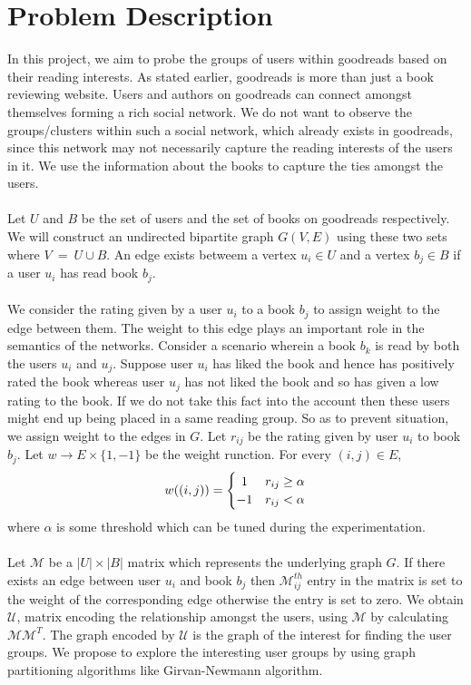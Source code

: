 \documentclass[11pt]{article}
\begin{document}
\section{Problem Description}
In this project, we aim to probe the groups of users within goodreads based on their reading interests. As stated earlier, goodreads is more than just a book reviewing website. Users and authors on goodreads can connect amongst themselves forming a rich social network. We do not want to observe the groups/clusters within such a social network, which already exists in goodreads, since this network may not necessarily capture the reading interests of the users in it. We use the information about the books to capture the ties amongst the users. \\\\
Let $U$ and $B$ be the set of users and the set of books on goodreads respectively. We will construct an undirected bipartite graph $G(V, E)$ using these two sets where $V ~=~ U \cup B$. An edge exists betweem a vertex $u_i \in U$ and a vertex $b_j \in B$ if a user $u_i$ has read book $b_j$.\\\\
We consider the rating given by a user $u_i$ to a book $b_j$ to assign weight to the edge between them. The weight to this edge plays an important role in the semantics of the networks. Consider a scenario wherein a book $b_k$ is read by both the users $u_i$ and $u_j$. Suppose user $u_i$ has liked the book and hence has positively rated the book whereas user $u_j$ has not liked the book and so has given a low rating to the book. If we do not take this fact into the account then these users might end up being placed in a same reading group. So as to prevent situation, we assign weight to the edges in $G$. Let $r_{ij}$ be the rating given by user $u_i$ to book $b_j$. Let $w \rightarrow E \times \{1, -1\}$ be the weight runction. For every $(i, j) \in E$, 
\[
	w((i, j)) = \left\{\def\arraystretch{1.2}%
		\begin{array}{@{}c@{\quad}l@{}}
		1 & r_{ij} \geq \alpha\\
		-1 & r_{ij} < \alpha\\
		\end{array}\right.
\]
where $\alpha$ is some threshold which can be tuned during the experimentation.
\\\\
Let $\mathcal{M}$ be a $|U| \times |B|$ matrix which represents the underlying graph $G$. If there exists an edge between user $u_i$ and book $b_j$ then $\mathcal{M}_{ij}^{th}$ entry in the matrix is set to the weight of the corresponding edge otherwise the entry is set to zero. We obtain $\mathcal{U}$, matrix encoding the relationship amongst the users, using $\mathcal{M}$ by calculating $\mathcal{M}\mathcal{M}^{T}$. The graph encoded by $\mathcal{U}$ is the graph of the interest for finding the user groups. We propose to explore the interesting user groups by using graph partitioning algorithms like Girvan-Newmann algorithm.
\end{document}
